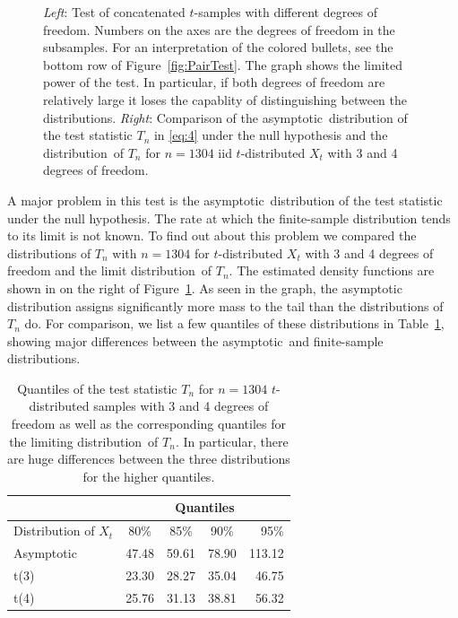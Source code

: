 \documentclass[11pt,a4]{amsart}
\newcommand{\asy}{asymptotic}
\newcommand{\ds}{distribution}
\newcommand{\1}{{\mathbf 1}}
\begin{document}
\begin{figure}[htb!]
\begin{minipage}{0.5\linewidth}
  \end{minipage}
  \caption{
    {\em Left}: Test  of concatenated $t$-samples with different
    degrees of freedom. Numbers on the axes are the degrees of freedom
    in the subsamples. For an interpretation of the colored bullets,
    see the bottom row of Figure~\ref{fig:PairTest}. The graph shows the limited power
    of the test. In particular, if both degrees of freedom are
    relatively large it loses the capablity of distinguishing between the \ds s.
    {\em Right}: Comparison of the \asy\ distribution of the test statistic
    $T_n$ in \eqref{eq:4} under the null hypothesis and the \ds\ of
    $T_n$ for $n=1304$ iid $t$-distributed $X_t$ with 3 and 4 degrees
    of freedom.
  }
  \label{fig:t_sim_pair}
\end{figure}

\par
A major problem in this test is the \asy\ distribution of the test statistic under the
null hypothesis.  The rate at which the finite-sample distribution tends to its limit is not known.
To find out about this problem we compared the \ds s of $T_n$ 
with $n=1304$ for $t$-distributed $X_t$ with  3 and 4 degrees of freedom and the limit \ds\ of $T_n$.
The estimated density functions are shown in on the right of Figure~\ref{fig:t_sim_pair}.
As seen in the graph, the asymptotic distribution assigns
significantly more mass to the tail than the \ds s of $T_n$ do. For
comparison, we list a few quantiles of these \ds s in
Table~\ref{tab:HogaAsymptotic}, showing major differences between the
\asy\ and finite-sample \ds s.
\begin{table}[htb!]
  \centering
  \begin{tabular}{l|c|c|c|r}
    & \multicolumn{4}{c}{Quantiles} \\[2mm]
    \hline
    Distribution of $X_t$& 80\% & 85\% & 90\% & 95\% \\
    \hline
    Asymptotic & 47.48 & 59.61 & 78.90 & 113.12 \\
    t(3)  & 23.30 & 28.27 & 35.04 & 46.75 \\
    t(4)  & 25.76 & 31.13 & 38.81 & 56.32\\[2mm]
  \end{tabular}
  \caption{Quantiles of the test statistic $T_n$ for $n=1304$ $t$-distributed samples with 3 and 4 degrees of freedom as well
as the corresponding quantiles for the limiting \ds\ of $T_n$. In particular, there are huge differences between the three \ds s  
for the higher quantiles. 
    }
  \label{tab:HogaAsymptotic}
\end{table}
\end{document}
